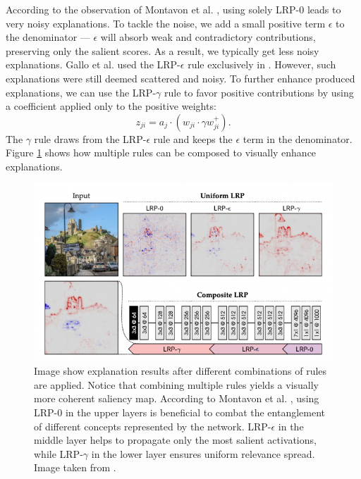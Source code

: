 According to the observation of Montavon et al. \cite{lrp}, using solely LRP-$0$ leads to very noisy explanations.
To tackle the noise, we add a small positive term $\epsilon$ to the denominator --- $\epsilon$ will absorb weak and contradictory contributions, preserving only the salient scores. 
As a result, we typically get less noisy explanations.
Gallo et al. used the LRP-$\epsilon$ rule exclusively in \cite{gallo}.
However, such explanations were still deemed scattered and noisy.
To further enhance produced explanations, we can use the LRP-$\gamma$ rule to favor positive contributions by using a coefficient applied only to the positive weights:
\begin{equation}
    z_{ji} = {a_j \cdot (w_{ji} \cdot \gamma w_{ji}^+)}.
\end{equation}
The $\gamma$ rule draws from the LRP-$\epsilon$ rule and keeps the $\epsilon$ term in the denominator.
Figure \ref{fig:lrp-montavon} shows how multiple rules can be composed to visually enhance explanations.

\begin{figure}[!h]
    \begin{center}
    \begin{minipage}{1\textwidth}
      \includegraphics[width=\textwidth]{img/lrp-montavon.png}
    \end{minipage}
    \caption{Image show explanation results after different combinations of rules are applied. Notice that combining multiple rules yields a visually more coherent saliency map. According to Montavon et al. \cite{lrp}, using LRP-$0$ in the upper layers is beneficial to combat the entanglement of different concepts represented by the network. LRP-$\epsilon$ in the middle layer helps to propagate only the most salient activations, while LRP-$\gamma$ in the lower layer ensures uniform relevance spread. Image taken from \cite{lrp}.}
    \label{fig:lrp-montavon}
    \end{center}
\end{figure}